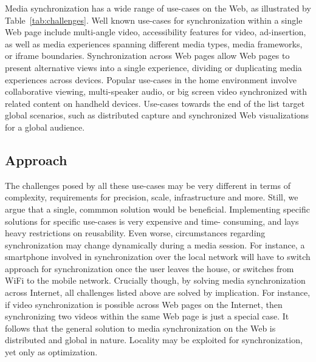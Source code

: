 Media synchronization has a wide range of use-cases on the Web, as illustrated
by Table~\ref{tab:challenges}. Well known use-cases for synchronization within
a single Web page include multi-angle video, accessibility features for video,
ad-insertion, as well as media experiences spanning different media types,
media frameworks, or iframe boundaries. Synchronization across Web pages allow
Web pages to present alternative views into a single experience, dividing or
duplicating media experiences across devices. Popular use-cases in the home
environment involve collaborative viewing, multi-speaker audio, or big screen
video synchronized with related content on handheld devices. Use-cases towards
the end of the list target global scenarios, such as distributed capture and
synchronized Web visualizations for a global audience.

\subsection{Approach}

The challenges posed by all these use-cases may be very different in terms of
complexity, requirements for precision, scale, infrastructure and more. Still,
we argue that a single, commmon solution would be beneficial. Implementing
specific solutions for specific use-cases is very expensive and time-
consuming, and lays heavy restrictions on reusability. Even worse,
circumstances regarding synchronization may change dynamically during a media
session. For instance, a smartphone involved in synchronization over the local
network will have to switch approach for synchronization once the user leaves
the house, or switches from WiFi to the mobile network. Crucially though, by
solving media synchronization across Internet, all challenges listed above are
solved by implication. For instance, if video synchronization is possible
across Web pages on the Internet, then synchronizing two videos within the
same Web page is just a special case. It follows that the general solution to
media synchronization on the Web is distributed and global in nature. Locality
may be exploited for synchronization, yet only as optimization.
